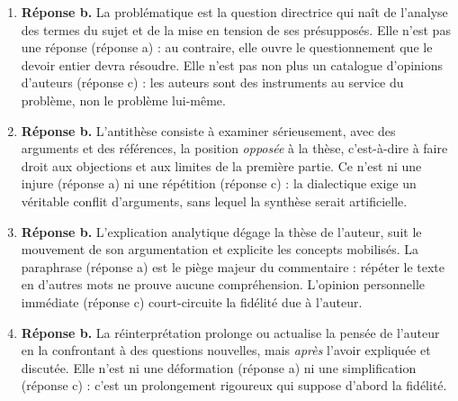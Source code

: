 \documentclass[11pt]{article}
\newcommand{\cle}[1]{{\popxbold\color{popdark}#1}}
\begin{document}
\begin{corrige}
\begin{enumerate}
\item \textbf{Réponse b.} La problématique est la \cle{question directrice} qui naît de l'analyse des termes du sujet et de la mise en tension de ses présupposés. Elle n'est pas une réponse (réponse a) : au contraire, elle ouvre le questionnement que le devoir entier devra résoudre. Elle n'est pas non plus un catalogue d'opinions d'auteurs (réponse c) : les auteurs sont des instruments au service du problème, non le problème lui-même.
\item \textbf{Réponse b.} L'antithèse consiste à examiner sérieusement, avec des arguments et des références, la position \emph{opposée} à la thèse, c'est-à-dire à faire droit aux objections et aux limites de la première partie. Ce n'est ni une injure (réponse a) ni une répétition (réponse c) : la dialectique exige un véritable conflit d'arguments, sans lequel la synthèse serait artificielle.
\item \textbf{Réponse b.} L'explication analytique dégage la thèse de l'auteur, suit le mouvement de son argumentation et explicite les concepts mobilisés. La paraphrase (réponse a) est le piège majeur du commentaire : répéter le texte en d'autres mots ne prouve aucune compréhension. L'opinion personnelle immédiate (réponse c) court-circuite la fidélité due à l'auteur.
\item \textbf{Réponse b.} La réinterprétation prolonge ou actualise la pensée de l'auteur en la confrontant à des questions nouvelles, mais \emph{après} l'avoir expliquée et discutée. Elle n'est ni une déformation (réponse a) ni une simplification (réponse c) : c'est un prolongement rigoureux qui suppose d'abord la fidélité.
\end{enumerate}
\end{corrige}
\end{document}
